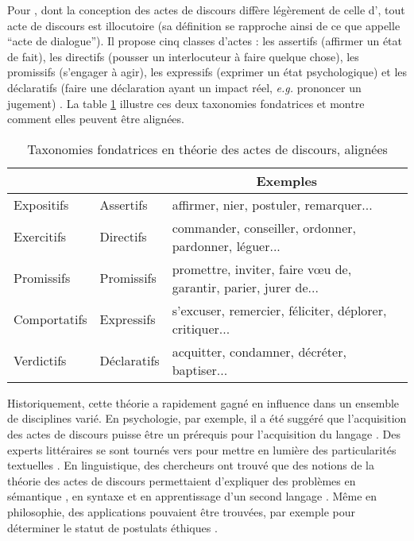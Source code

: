 \documentclass[10pt,a4paper,twoside]{article}
\newcommand{\quotes}[1]{``#1''}
\begin{document}
Pour \citet{searle1969speech}, dont la conception des actes de discours diffère légèrement de celle d'\citeauthor{austin1975how}, tout acte de discours est illocutoire (sa définition se rapproche ainsi de ce que \citeauthor{austin1975how} appelle \quotes{acte de dialogue}). Il propose cinq classes d’actes : les assertifs (affirmer un état de fait), les directifs (pousser un interlocuteur à faire quelque chose), les promissifs (s'engager à agir), les expressifs (exprimer un état psychologique) et les déclaratifs (faire une déclaration ayant un impact réel, \textit{e.g.} prononcer un jugement) \cite{searle1976taxonomy}. La table \ref{fig:fundamentalTaxonomies} illustre ces deux taxonomies fondatrices et montre comment elles peuvent être alignées.

\begin{table}
	\centering
	\begin{tabular}{lll}
		\toprule
		\multicolumn{1}{c}{\citet{austin1975how}} & \multicolumn{1}{c}{\citet{searle1976taxonomy}} & \multicolumn{1}{c}{Exemples} \\
		\midrule
		Expositifs & Assertifs & affirmer, nier, postuler, remarquer... \\
		Exercitifs & Directifs & commander, conseiller, ordonner, pardonner, léguer... \\
		Promissifs & Promissifs & promettre, inviter, faire vœu de, garantir, parier, jurer de...  \\
		Comportatifs & Expressifs & s’excuser, remercier, féliciter, déplorer, critiquer... \\
		Verdictifs & Déclaratifs & acquitter, condamner, décréter, baptiser... \\
		\bottomrule
	\end{tabular}
	\caption{Taxonomies fondatrices en théorie des actes de discours, alignées}
	\label{fig:fundamentalTaxonomies}
\end{table}

Historiquement, cette théorie a rapidement gagné en influence dans un ensemble de disciplines varié. En psychologie, par exemple, il a été suggéré que l'acquisition des actes de discours puisse être un prérequis pour l'acquisition du langage \cite{bruner1975communication, bates1977gesture}. Des experts littéraires se sont tournés vers \citeauthor{austin1975how} pour mettre en lumière des particularités textuelles \cite{ohmann1971speech}. En linguistique, des chercheurs ont trouvé que des notions de la théorie des actes de discours permettaient d'expliquer des problèmes en sémantique \cite{fillmore1971some}, en syntaxe \cite{sadock1974toward} et en apprentissage d'un second langage \cite{jakobovits1974context}. Même en philosophie, des applications pouvaient être trouvées, par exemple pour déterminer le statut de postulats éthiques \cite{searle1969speech}.
\end{document}
